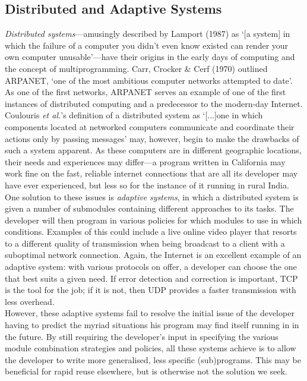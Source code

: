 \documentclass[compsoc,12pt,a4paper]{IEEEtran}
\begin{document}
		\subsection{Distributed and Adaptive Systems}
		
			\textit{Distributed systems}---amusingly described by Lamport (1987) as `[a system] in which the failure of a computer you didn't even know existed can render your own computer unusable'\cite{email}---have their origins in the early days of computing and the concept of multiprogramming. Carr, Crocker \& Cerf (1970) outlined ARPANET, `one of the most ambitious computer networks attempted to date'.\cite{rfc} As one of the first networks, ARPANET serves an example of one of the first instances of distributed computing and a predecessor to the modern-day Internet. Coulouris \textit{et al.}'s  definition of a distributed system as `[...]one in which components located at networked computers communicate and coordinate their actions only by passing messages'\cite{distsys} may, however, begin to make the drawbacks of such a system apparent. As these computers are in different geographic locations, their needs and experiences may differ---a program written in California may work fine on the fast, reliable internet connections that are all its developer may have ever experienced, but less so for the instance of it running in rural India.\\
			One solution to these issues is \textit{adaptive systems}, in which a distributed system is given a number of submodules containing different approaches to its tasks. The developer will then program in various policies for which modules to use in which conditions. Examples of this could include a live online video player that resorts to a different quality of transmission when being broadcast to a client with a suboptimal network connection. Again, the Internet is an excellent example of an adaptive system: with various protocols on offer, a developer can choose the one that best suits a given need. If error detection and correction is important, TCP is the tool for the job; if it is not, then UDP provides a faster transmission with less overhead.\\
			However, these adaptive systems fail to resolve the initial issue of the developer having to predict the myriad situations his program may find itself running in in the future. By still requiring the developer's input in specifying the various module combination strategies and policies, all these systems achieve is to allow the developer to write more generalised, less specific (sub)programs. This may be beneficial for rapid reuse elsewhere, but is otherwise not the solution we seek.
		 
\end{document}
